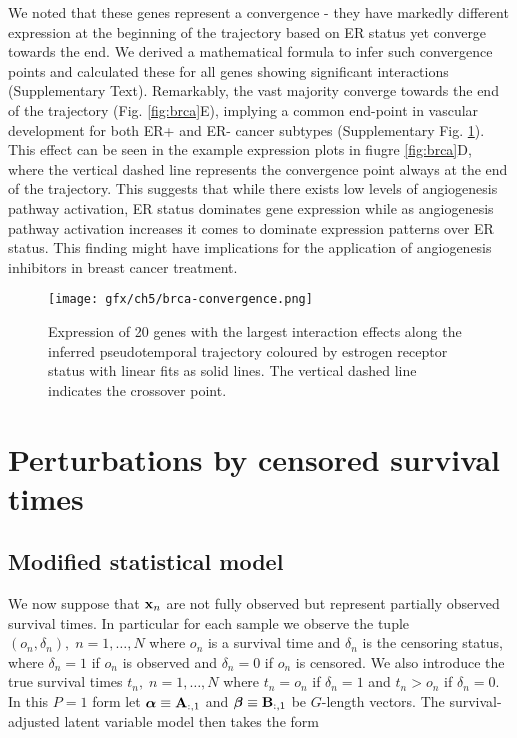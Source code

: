 We noted that these genes represent a convergence - they have markedly different expression at the beginning of the trajectory based on ER status yet converge towards the end. We derived a mathematical formula to infer such convergence points and calculated these for all genes showing significant interactions (Supplementary Text). Remarkably, the vast majority converge towards the end of the trajectory (Fig. \ref{fig:brca}E), implying a common end-point in vascular development for both ER+ and ER- cancer subtypes (Supplementary Fig. \ref{fig:brca_convergence}).
This effect can be seen in the example expression plots in fiugre \ref{fig:brca}D, where the vertical dashed line represents the convergence point always at the end of the trajectory.
This suggests that while there exists low levels of angiogenesis pathway activation, ER status dominates gene expression while as angiogenesis pathway activation increases it comes to dominate expression patterns over ER status. This finding might have implications for the application of angiogenesis inhibitors in breast cancer treatment.

\begin{figure}
   \texttt{[image: gfx/ch5/brca-convergence.png]}
   \caption{Expression of 20 genes with the largest interaction effects along the inferred pseudotemporal trajectory coloured by estrogen receptor status with linear fits as solid lines. The vertical dashed line indicates the crossover point.}
	\label{fig:brca_convergence}
\end{figure}


\section{Perturbations by censored survival times} \label{sec:survival}

\subsection{Modified statistical model}


We now suppose that $\mathbf{x}_n$ are not fully observed but represent partially observed survival times. In particular for each sample we observe the tuple $(o_n, \delta_n), \; n = 1, \ldots, N$ where $o_n$ is a survival time and $\delta_n$ is the censoring status, where $\delta_n = 1$ if $o_n$ is observed and $\delta_n = 0$ if $o_n$ is censored. We also introduce the true survival times $t_n, \; n = 1, \ldots, N$
where $t_n = o_n$ if $\delta_n = 1$ and $t_n > o_n$ if $\delta_n = 0$. In this $P = 1$ form let $\bm{\alpha} \equiv \mathbf{A}_{:,1}$ and $\bm{\beta} \equiv \mathbf{B}_{:,1}$ be $G$-length vectors. The survival-adjusted latent variable model then takes the form

